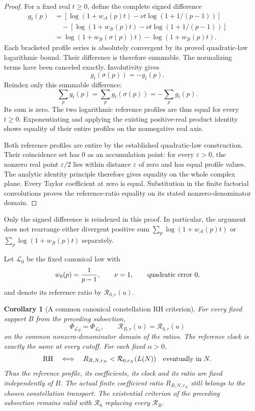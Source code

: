 \documentclass[11pt]{article}
\newtheorem{corollary}[theorem]{Corollary}
\theoremstyle{definition}
\begin{document}
\begin{proof}
For a fixed real $t\ge0$, define the complete signed difference
\[
 \begin{split}
 g_t(p)
 &=\left[\log(1+w_{\mathcal A}(p)t)
           -\nu t\log(1+1/(p-1))\right]\\
 &\quad-\left[\log(1+w_{\mathcal B}(p)t)
           -\nu t\log(1+1/(p-1))\right]\\
 &=\log(1+w_{\mathcal B}(\sigma(p))t)
                  -\log(1+w_{\mathcal B}(p)t).
 \end{split}
\]
Each bracketed profile series is absolutely convergent by its proved
quadratic-law logarithmic bound. Their difference is therefore summable.
The normalizing terms have been canceled exactly. Involutivity gives
\[
 g_t(\sigma(p))=-g_t(p).
\]
Reindex only this summable difference:
\[
 \sum_p g_t(p)=\sum_p g_t(\sigma(p))
             =-\sum_p g_t(p).
\]
Its sum is zero. The two logarithmic reference profiles are thus equal
for every $t\ge0$. Exponentiating and applying the existing positive-real
product identity shows equality of their entire profiles on the
nonnegative real axis.

Both reference profiles are entire by the established quadratic-law
construction. Their coincidence set has $0$ as an accumulation point:
for every $\varepsilon>0$, the nonzero real point $\varepsilon/2$
lies within distance $\varepsilon$ of zero and has equal profile values.
The analytic identity principle therefore gives equality on the whole
complex plane. Every Taylor coefficient at zero is equal. Substitution
in the finite factorial convolutions proves the reference-ratio equality
on its stated nonzero-denominator domain.
\end{proof}

Only the signed difference is reindexed in this proof. In particular,
the argument does not rearrange either divergent positive sum
$\sum_p\log(1+w_{\mathcal A}(p)t)$ or
$\sum_p\log(1+w_{\mathcal B}(p)t)$ separately.

Let $\mathcal L_0$ be the fixed canonical law with
\[
 w_0(p)=\frac1{p-1},\qquad \nu=1,\qquad\hbox{quadratic error }0,
\]
and denote its reference ratio by $\mathcal R_{0,r}(u)$.

\begin{corollary}[A common canonical constellation RH criterion]
For every fixed support $B$ from the preceding subsection,
\[
 \Phi_{\mathcal L_B}=\Phi_{\mathcal L_0},\qquad
 \mathcal R_{B,r}(u)=\mathcal R_{0,r}(u)
\]
on the common nonzero-denominator domain of the ratios. The reference
clock is exactly the same at every cutoff. For each fixed $\alpha>0$,
\[
 \mathrm{RH}\quad\Longleftrightarrow\quad
 R_{B,N,r_N}<\mathcal R_{0,r_N}(L(N))
       \quad\hbox{eventually in }N.
\]
Thus the reference profile, its coefficients, its clock and its ratio
are fixed independently of $B$. The actual finite coefficient ratio
$R_{B,N,r_N}$ still belongs to the chosen constellation transport.
The existential criterion of the preceding subsection remains valid
with $\mathcal R_0$ replacing every $\mathcal R_B$.
\end{corollary}
\end{document}
